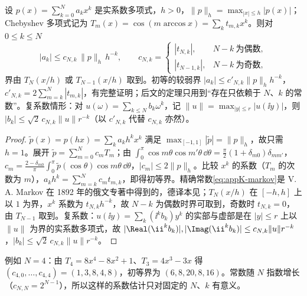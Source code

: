 \begin{lemma}\label{lem:appK-markov}
设 $p(x)=\sum_{k=0}^Na_kx^k$ 是实系数多项式，$h>0$，$\|p\|_h=\max_{|x|\le h}|p(x)|$；Chebyshev 多项式记为 $T_m(x)=\cos(m\arccos x)=\sum_kt_{m,k}x^k$。则对 $0\le k\le N$
\begin{equation}\label{eq:appK-markov}
|a_k|\le c_{N,k}\,\|p\|_h\,h^{-k},\qquad
c_{N,k}=\begin{cases}|t_{N,k}|,&N-k\ \text{为偶数},\\|t_{N-1,k}|,&N-k\ \text{为奇数},\end{cases}
\end{equation}
界由 $T_N(x/h)$ 或 $T_{N-1}(x/h)$ 取到。初等的较弱界 $|a_k|\le c'_{N,k}\|p\|_hh^{-k}$，$c'_{N,k}=2\sum_{m=k}^N|t_{m,k}|$，有完整证明；后文的定理只用到“存在只依赖于 $N$、$k$ 的常数”。复系数情形：对 $u(\omega)=\sum_{k\le N}b_k\omega^k$，记 $\|u\|=\max_{|y|\le r}|u(\ii y)|$，则 $|b_k|\le\sqrt2\,c_{N,k}\|u\|r^{-k}$（以 $c'_{N,k}$ 代替 $c_{N,k}$ 亦然）。
\end{lemma}

\begin{proof}
$\tilde p(x)=p(hx)=\sum_ka_kh^kx^k$ 满足 $\max_{[-1,1]}|\tilde p|=\|p\|_h$，故只需 $h=1$。展开 $\tilde p=\sum_{m=0}^Nc_mT_m$；由 $\int_0^\pi\cos m\theta\cos m'\theta\,\dd\theta=\frac\pi2(1+\delta_{m0})\delta_{mm'}$，$c_m=\frac{2-\delta_{m0}}{\pi}\int_0^\pi\tilde p(\cos\theta)\cos m\theta\,\dd\theta$，$|c_m|\le2\|p\|_h$。比较 $x^k$ 的系数（$T_m$ 的次数为 $m$），$a_kh^k=\sum_{m=k}^Nc_mt_{m,k}$，即得初等界。精确常数\cref{eq:appK-markov}是 V. A. Markov 在 1892 年的俄文专著中得到的，德译本见\cite{Markoff1916}；$T_N(x/h)$ 在 $[-h,h]$ 上以 $1$ 为界，$x^k$ 系数为 $t_{N,k}h^{-k}$，故 $N-k$ 为偶数时界可取到，奇数时 $t_{N,k}=0$，由 $T_{N-1}$ 取到。复系数：$u(\ii y)=\sum_k(\ii^kb_k)y^k$ 的实部与虚部是在 $|y|\le r$ 上以 $\|u\|$ 为界的实系数多项式，故 $|\Real(\ii^kb_k)|,|\Imag(\ii^kb_k)|\le c_{N,k}\|u\|r^{-k}$，$|b_k|\le\sqrt2\,c_{N,k}\|u\|r^{-k}$。
\end{proof}

例如 $N=4$：由 $T_4=8x^4-8x^2+1$、$T_3=4x^3-3x$ 得 $(c_{4,0},\dots,c_{4,4})=(1,3,8,4,8)$，初等界为 $(6,8,20,8,16)$。常数随 $N$ 指数增长（$c_{N,N}=2^{N-1}$），所以这样的系数估计只对固定的 $N$、$k$ 有意义。

